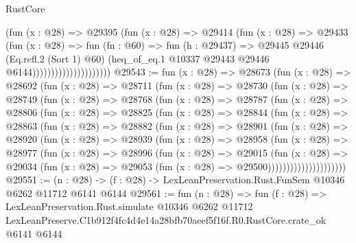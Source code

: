 \begin{lexlean}{RustCore}
\begin{coremodule}
                                    (fun (x : @28) =>
                                    @29395
                                      (fun (x : @28) =>
                                      @29414
                                        (fun (x : @28) =>
                                        @29433
                                          (fun (x : @28) =>
                                          fun (fn : @60) =>
                                          fun (h : @29437) =>
                                          @29445
                                            @29446
                                            (Eq.refl.{2} (Sort 1) @60)
                                            (heq_of_eq.{1}
                                              @10337
                                              @29443
                                              @29446
                                              @6144)))))))))))))))))))))
@29543 := fun (x : @28) =>
  @28673
    (fun (x : @28) =>
    @28692
      (fun (x : @28) =>
      @28711
        (fun (x : @28) =>
        @28730
          (fun (x : @28) =>
          @28749
            (fun (x : @28) =>
            @28768
              (fun (x : @28) =>
              @28787
                (fun (x : @28) =>
                @28806
                  (fun (x : @28) =>
                  @28825
                    (fun (x : @28) =>
                    @28844
                      (fun (x : @28) =>
                      @28863
                        (fun (x : @28) =>
                        @28882
                          (fun (x : @28) =>
                          @28901
                            (fun (x : @28) =>
                            @28920
                              (fun (x : @28) =>
                              @28939
                                (fun (x : @28) =>
                                @28958
                                  (fun (x : @28) =>
                                  @28977
                                    (fun (x : @28) =>
                                    @28996
                                      (fun (x : @28) =>
                                      @29015
                                        (fun (x : @28) =>
                                        @29034
                                          (fun (x : @28) =>
                                          @29053 (fun (x : @28) => @29500)))))))))))))))))))))
@29551 := (n : @28) -> (f : @28) -> LexLeanPreservation.Rust.FunSem @10346 @6262 @11712 @6141 @6144
@29561 := fun (n : @28) =>
  fun (f : @28) =>
  LexLeanPreservation.Rust.simulate
    @10346
    @6262
    @11712
    LexLeanPreserve.C1b912f4fc4d4e14a28bfb70aeef5f16f.R0.RustCore.crate_ok
    @6141
    @6144
\end{coremodule}
\end{lexlean}
